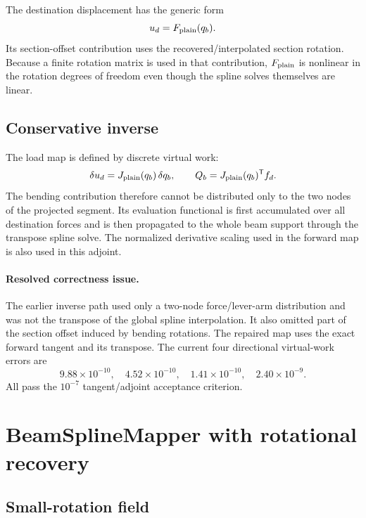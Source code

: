 \documentclass[11pt,a4paper]{article}
\newcommand{\T}{\mathsf{T}}
\begin{document}
The destination displacement has the generic form
\[
  u_d=F_{\rm plain}(q_b).
\]
Its section-offset contribution uses the recovered/interpolated section
rotation.  Because a finite rotation matrix is used in that contribution,
\(F_{\rm plain}\) is nonlinear in the rotation degrees of freedom even though
the spline solves themselves are linear.

\subsection{Conservative inverse}

The load map is defined by discrete virtual work:
\[
  \delta u_d=J_{\rm plain}(q_b)\,\delta q_b,\qquad
  Q_b=J_{\rm plain}(q_b)^\T f_d.
\]
The bending contribution therefore cannot be distributed only to the two
nodes of the projected segment.  Its evaluation functional is first
accumulated over all destination forces and is then propagated to the whole
beam support through the transpose spline solve.  The normalized derivative
scaling used in the forward map is also used in this adjoint.

\paragraph{Resolved correctness issue.}
The earlier inverse path used only a two-node force/lever-arm distribution and
was not the transpose of the global spline interpolation.  It also omitted
part of the section offset induced by bending rotations.  The repaired map
uses the exact forward tangent and its transpose.  The current four
directional virtual-work errors are
\[
  9.88\times10^{-10},\quad 4.52\times10^{-10},\quad
  1.41\times10^{-10},\quad 2.40\times10^{-9}.
\]
All pass the \(10^{-7}\) tangent/adjoint acceptance criterion.

\section{BeamSplineMapper with rotational recovery}

\subsection{Small-rotation field}
\end{document}
